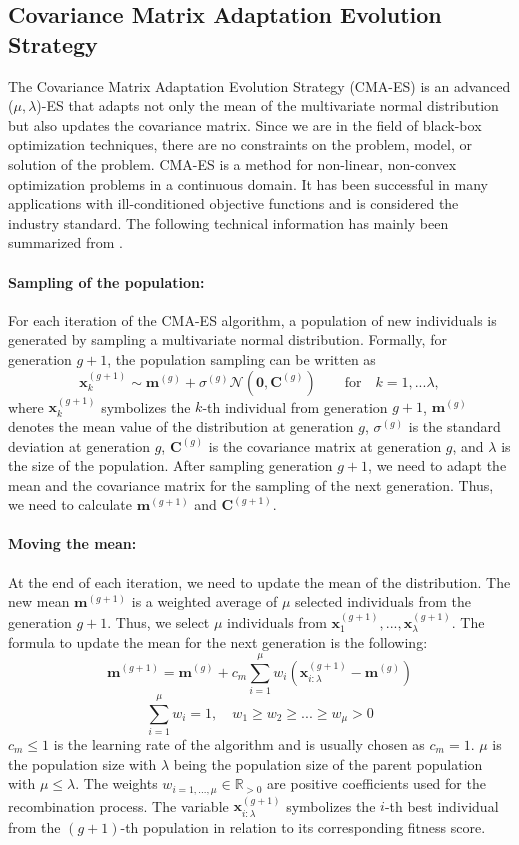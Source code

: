 \subsection{Covariance Matrix Adaptation Evolution Strategy}
The Covariance Matrix Adaptation Evolution Strategy (CMA-ES) is an advanced ($\mu, \lambda$)-ES that adapts not only the mean of the multivariate normal distribution but also updates the covariance matrix. Since we are in the field of black-box optimization techniques, there are no constraints on the problem, model, or solution of the problem. CMA-ES is a method for non-linear, non-convex optimization problems in a continuous domain. It has been successful in many applications with ill-conditioned objective functions and is considered the industry standard. The following technical information has mainly been summarized from \cite{hansen2016cma}.

\paragraph*{Sampling of the population:} For each iteration of the CMA-ES algorithm, a population of new individuals is generated by sampling a multivariate normal distribution. Formally, for generation $g+1$, the population sampling can be written as
\[
  \mathbf{x}_k^{(g+1)} \sim \mathbf{m}^{(g)} + \sigma^{(g)}  \mathcal{N}(\mathbf{0}, \mathbf{C}^{(g)}) \qquad \text{for} \quad k = 1, ... \lambda,
\]
where $\mathbf{x}_k^{(g+1)}$ symbolizes the $k$-th individual from generation $g+1$, $\mathbf{m}^{(g)}$ denotes the mean value of the distribution at generation $g$, $\sigma^{(g)}$ is the standard deviation at generation $g$, $\mathbf{C}^{(g)}$ is the covariance matrix at generation $g$, and $\lambda$ is the size of the population. After sampling generation $g+1$, we need to adapt the mean and the covariance matrix for the sampling of the next generation. Thus, we need to calculate $\mathbf{m}^{(g+1)}$ and $\mathbf{C}^{(g+1)}$.

\paragraph*{Moving the mean:} At the end of each iteration, we need to update the mean of the distribution. The new mean $\mathbf{m}^{(g+1)}$ is a weighted average of $\mu$ selected individuals from the generation $g+1$. Thus, we select $\mu$ individuals from $\mathbf{x}_1^{(g+1)}, ..., \mathbf{x}_\lambda^{(g+1)}$. The formula to update the mean for the next generation is the following:
\[
  \mathbf{m}^{(g+1)} = \mathbf{m}^{(g)} + c_m \sum^\mu_{i=1} w_i (\mathbf{x}_{i:\lambda}^{(g+1)} - \mathbf{m}^{(g)})
\]
\[
  \sum^\mu_{i=1} w_i = 1, \quad w_1 \geq w_2 \geq ... \geq w_\mu > 0
\]
$c_m \leq 1$ is the learning rate of the algorithm and is usually chosen as $c_m = 1$. $\mu$ is the population size with $\lambda$ being the population size of the parent population with $\mu \leq \lambda$. The weights $w_{i=1,...,\mu} \in \mathbb{R}_{>0}$ are positive coefficients used for the recombination process. The variable $\mathbf{x}_{i:\lambda}^{(g+1)}$ symbolizes the $i$-th best individual from the $(g+1)$-th population in relation to its corresponding fitness score.

